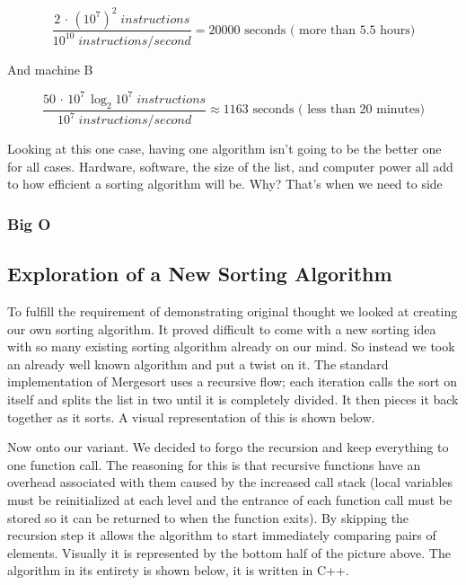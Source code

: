 \documentclass[12pt]{article}
\begin{document}
	$$\frac{2\,\cdot\,(10^7)^2 \;instructions}{10^{10} \;instructions/\!second}=20000\mbox{ seconds ( more than 5.5 hours)}$$
	
	And machine B
	
	$$\frac{50\,\cdot\,10^7\,\log_2{10^7}\;instructions}{10^{7} \;instructions/\!second}\approx1163\mbox{ seconds ( less than 20 minutes)}$$
	
	Looking at this one case, having one algorithm isn't going to be the better one for all cases. Hardware, software, the size of the list, and computer power all add to how efficient a sorting algorithm will be. Why? That's when we need to side 
	
	\subsubsection{Big O}
	
	\subsection{Exploration of a New Sorting Algorithm}
	
	
	To fulfill the requirement of demonstrating original thought we looked at creating our own sorting algorithm.
	 It proved difficult to come with a new sorting idea with so many existing sorting algorithm already on our mind.
	So instead we took an already well known algorithm and put a twist on it. 
	The standard implementation of Mergesort uses a recursive flow; each iteration calls the sort on itself and splits the list in two until it is completely divided. 
	It then pieces it back together as it sorts. 
	A visual representation of this is shown below.

	
	Now onto our variant. 
	We decided to forgo the recursion and keep everything to one function call. 
	The reasoning for this is that recursive functions have an overhead associated with them caused by the increased call stack (local variables must be reinitialized at each level and the entrance of each function call must be stored so it can be returned to when the function exits). 
	By skipping the recursion step it allows the algorithm to start immediately comparing pairs of elements. 
	Visually it is represented by the bottom half of the picture above. 
	The algorithm in its entirety is shown below, it is written in C++.
	
		
\end{document}
